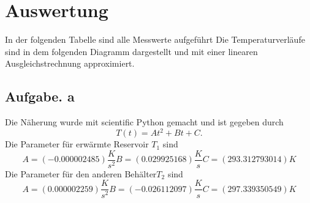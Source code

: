 \section{Auswertung}
\label{sec:Auswertung}
In der folgenden Tabelle sind alle Messwerte aufgeführt
Die Temperaturverläufe sind in dem folgenden Diagramm dargestellt und mit einer
linearen Ausgleichstrechnung approximiert.
\subsection{Aufgabe. a}
%  
Die Näherung wurde mit scientific Python gemacht und ist gegeben durch
\begin{equation}
  T(t)=At^2+Bt+C .
\end{equation}
Die Parameter für erwärmte Reservoir $T_1$ sind
\begin{equation}
  A=(  -0.000002485)\frac{K}{s^2}
  B=(   0.029925168)\frac{K}{s}
  C=( 293.312793014)K
\end{equation}
Die Parameter für den anderen Behälter$T_2$ sind
\begin{equation}
  A=(  0.000002259)\frac{K}{s^2}
  B=( -0.026112097)\frac{K}{s}
  C=(297.339350549)K

\end{equation}
